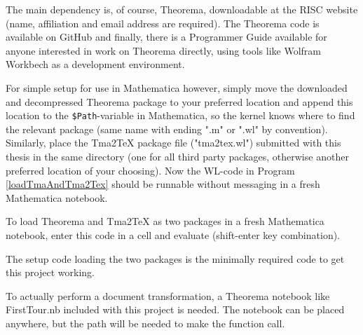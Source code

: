 The main dependency is, of course, Theorema, downloadable at the RISC website \cite{noauthor_download_nodate} (name, affiliation and email address are required). The Theorema code is available on GitHub \cite{noauthor_github_nodate} and finally, there is a Programmer Guide  \cite{noauthor_programmers_nodate} available for anyone interested in work on Theorema directly, using tools like Wolfram Workbech \cite{noauthor_wolfram_nodate} as a development environment.

For simple setup for use in Mathematica however, simply move the downloaded and decompressed Theorema package to your preferred location and append this location to the \lstinline+$Path+-variable in Mathematica, so the kernel knows where to find the relevant package (same name with ending ".m" or ".wl" by convention). Similarly, place the Tma2TeX package file ("tma2tex.wl") submitted with this thesis in the same directory (one for all third party packages, otherwise another preferred location of your choosing). Now the  WL-code in Program \ref{loadTmaAndTma2Tex} should be runnable without messaging in a fresh Mathematica notebook. 

\begin{program}
\caption{To load Theorema and Tma2TeX as two packages in a fresh Mathematica notebook, enter this code in a cell and evaluate (shift-enter key combination).}
\label{loadTmaAndTma2Tex}
\end{program}

The setup code loading the two packages is the minimally required code to get this project working.

To actually perform a document transformation, a Theorema notebook like FirstTour.nb included with this project is needed. The notebook can be placed anywhere, but the path will be needed to make the function call.

